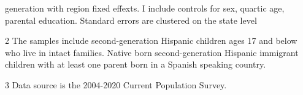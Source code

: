 \begin{table}[H]
{\begin{threeparttable}
\begin{tablenotes}
{                      generation with region fixed effexts. 
                      I include controls for sex, quartic age, parental education.
                      Standard errors are clustered on the state level}
\item[2] \footnotesize{The samples include second-generation Hispanic children ages 17 and below who live in intact families. 
                      Native born second-generation Hispanic 
                      immigrant children with at least one parent born in a Spanish speaking 
                      country.}
\item[3] \footnotesize{Data source is the 2004-2020 Current Population Survey.}
\end{tablenotes}
\end{threeparttable}}
\end{table}
